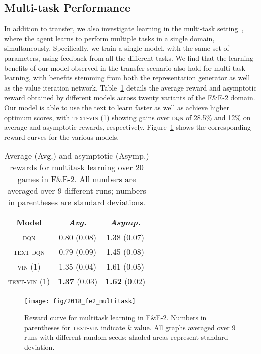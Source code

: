 \subsection{Multi-task Performance}
In addition to transfer, we also investigate learning in the multi-task setting~\cite{caruana1997multitask}, where the agent learns to perform multiple tasks in a single domain, simultaneously. Specifically, we train a single model, with the same set of parameters, using feedback from all the different tasks. We find that the learning benefits of our model observed in the transfer scenario also hold for multi-task learning, with benefits stemming from both the representation generator as well as the value iteration network. Table~\ref{table:multitask} details the average reward and asymptotic reward obtained by different models across twenty variants of the F\&E-2 domain. Our model is able to use the text to learn faster as well as achieve higher optimum scores, with \textsc{text-vin (1)} showing gains over \textsc{dqn} of 28.5\% and 12\% on average and asymptotic rewards, respectively. Figure~\ref{fig:results-multitask} shows the corresponding reward curves for the various models.

\begin{table}[!h]
\centering
\begin{tabular}{ c  c  c } %
\textbf{Model} & \emph{Avg.} & \emph{Asymp.}  \\ \midrule
\textsc{dqn}  & 0.80 (0.08) & 1.38 (0.07)\\
\textsc{text-dqn}  & 0.79 (0.09) & 1.45 (0.08) \\
\textsc{vin (1)} & 1.35 (0.04) & 1.61 (0.05)\\
\textsc{text-vin (1)} &\textbf{1.37} (0.03) & \textbf{1.62} (0.02) \\
\end{tabular}
\caption{Average (Avg.) and asymptotic (Asymp.) rewards for multitask learning over 20 games in F\&E-2. All numbers are averaged over 9 different runs; numbers in parentheses are standard deviations.}
\label{table:multitask}
\end{table}

\begin{figure}[!h]
\centering
{}
\texttt{[image: fig/2018\_fe2\_multitask]}
\endminipage\hfill
\caption{Reward curve for multitask learning in F\&E-2. Numbers in parentheses for \textsc{text-vin} indicate $k$ value. All graphs averaged over 9 runs with different random seeds; shaded areas represent standard deviation.
}
	\label{fig:results-multitask}
\end{figure}

